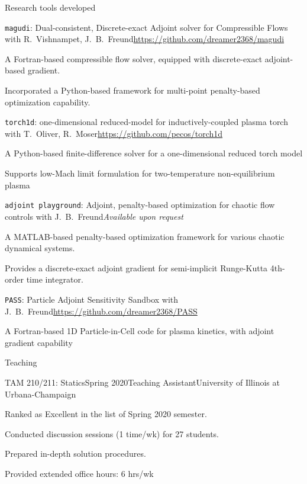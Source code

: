 \documentclass{resume} %
\begin{document}
\begin{rSection}{Research tools developed}
\begin{rSubsection}{\texttt{magudi}: Dual-consistent, Discrete-exact Adjoint solver for Compressible Flows}{}
{with R.\ Vishnampet, J.\ B.\ Freund}{\url{https://github.com/dreamer2368/magudi}}
\item A Fortran-based compressible flow solver, equipped with discrete-exact adjoint-based gradient.
\item Incorporated a Python-based framework for multi-point penalty-based optimization capability.
\end{rSubsection}
\begin{rSubsection}{\texttt{torch1d}: one-dimensional reduced-model for inductively-coupled plasma torch}{}
{with T.\ Oliver, R.\ Moser}{\url{https://github.com/pecos/torch1d}}
\item A Python-based finite-difference solver for a one-dimensional reduced torch model
\item Supports low-Mach limit formulation for two-temperature non-equilibrium plasma
\end{rSubsection}
\begin{rSubsection}{\texttt{adjoint playground}: Adjoint, penalty-based optimization for chaotic flow controls}{}
{with J.\ B.\ Freund}{\em Available upon request}
\item A MATLAB-based penalty-based optimization framework for various chaotic dynamical systems.
\item Provides a discrete-exact adjoint gradient for semi-implicit Runge-Kutta 4th-order time integrator.
\end{rSubsection}
\begin{rSubsection}{\texttt{PASS}: Particle Adjoint Sensitivity Sandbox}{}
{with J.\ B.\ Freund}{\url{https://github.com/dreamer2368/PASS}}
\item A Fortran-based 1D Particle-in-Cell code for plasma kinetics, with adjoint gradient capability
\end{rSubsection}
\end{rSection}


\begin{rSection}{Teaching}


\begin{rSubsection}{TAM 210/211: Statics}{Spring 2020}{Teaching Assistant}{University of Illinois at Urbana-Champaign}
\item Ranked as Excellent in the list of Spring 2020 semester.
\item Conducted discussion sessions (1 time/wk) for 27 students.
\item Prepared in-depth solution procedures.
\item Provided extended office hours: 6 hrs/wk
\end{rSubsection}


\end{rSection}
\end{document}
